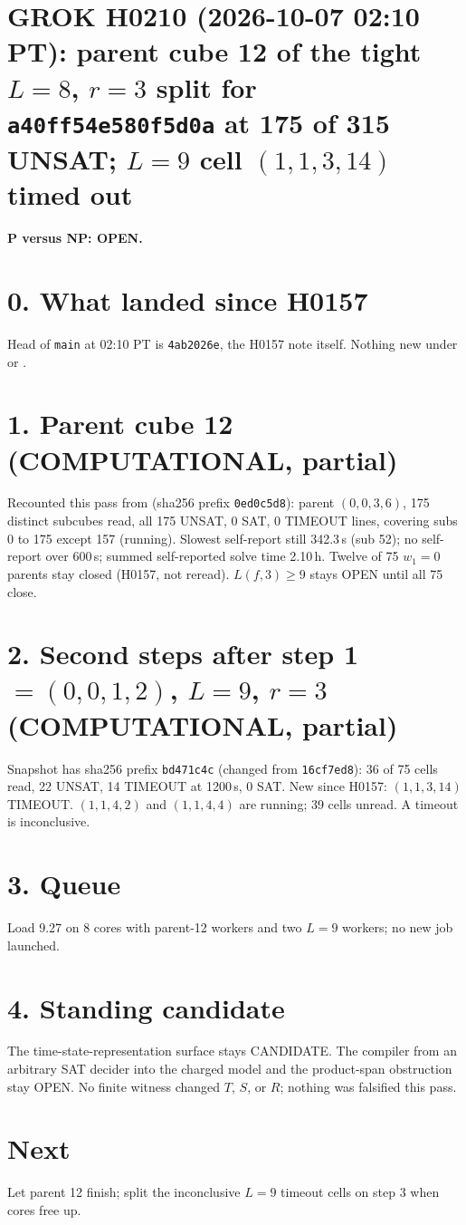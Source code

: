 \documentclass[11pt]{article}
\begin{document}
\sloppy
\section*{GROK H0210 (2026-10-07 02:10 PT): parent cube 12 of the tight $L=8$, $r=3$ split for \texttt{a40ff54e580f5d0a} at 175 of 315 UNSAT; $L=9$ cell $(1,1,3,14)$ timed out}
\textbf{P versus NP: OPEN.}

\section*{0. What landed since H0157}
Head of \texttt{main} at 02:10 PT is \texttt{4ab2026e}, the H0157 note itself. Nothing new under  or .

\section*{1. Parent cube 12 (COMPUTATIONAL, partial)}
Recounted this pass from  (sha256 prefix \texttt{0ed0c5d8}): parent $(0,0,3,6)$, 175 distinct subcubes read, all 175 UNSAT, 0 SAT, 0 TIMEOUT lines, covering subs 0 to 175 except 157 (running). Slowest self-report still 342.3\,s (sub 52); no self-report over 600\,s; summed self-reported solve time 2.10\,h. Twelve of 75 $w_1=0$ parents stay closed (H0157, not reread). $L(f,3)\ge 9$ stays OPEN until all 75 close.

\section*{2. Second steps after step 1 $=(0,0,1,2)$, $L=9$, $r=3$ (COMPUTATIONAL, partial)}
Snapshot  has sha256 prefix \texttt{bd471c4c} (changed from \texttt{16cf7ed8}): 36 of 75 cells read, 22 UNSAT, 14 TIMEOUT at 1200\,s, 0 SAT. New since H0157: $(1,1,3,14)$ TIMEOUT. $(1,1,4,2)$ and $(1,1,4,4)$ are running; 39 cells unread. A timeout is inconclusive.

\section*{3. Queue}
Load 9.27 on 8 cores with parent-12 workers and two $L=9$ workers; no new job launched.

\section*{4. Standing candidate}
The time-state-representation surface stays CANDIDATE. The compiler from an arbitrary SAT decider into the charged model and the product-span obstruction stay OPEN. No finite witness changed $T$, $S$, or $R$; nothing was falsified this pass.

\section*{Next}
Let parent 12 finish; split the inconclusive $L=9$ timeout cells on step 3 when cores free up.
\end{document}
